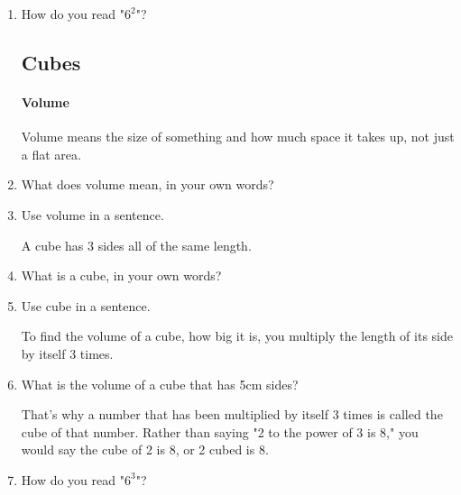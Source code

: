 \documentclass[12pt]{article}
\begin{document}
\begin{enumerate}
\item How do you read "$6^2$"?

\subsection*{Cubes}

\paragraph{Volume}
Volume means the size of something and how much space it takes up, not just a flat area.\\

\item What does volume mean, in your own words?
\item Use volume in a sentence.

A cube has 3 sides all of the same length.

\item What is a cube, in your own words?
\item Use cube in a sentence.

To find the volume of a cube, how big it is, you multiply the length of its side by itself 3 times.\\

\item What is the volume of a cube that has 5cm sides?

That's why a number that has been multiplied by itself 3 times is called the cube of that number. Rather than saying "2 to the power of 3 is 8," you would say the cube of 2 is 8, or 2 cubed is 8.

\item How do you read "$6^3$"?

\vspace{14pt}


\end{enumerate}
\end{document}
